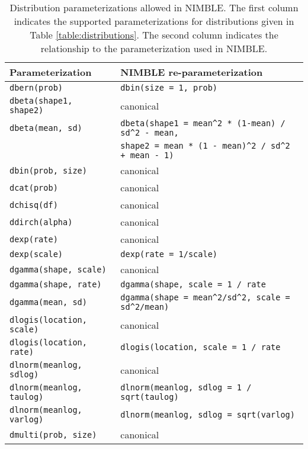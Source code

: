   \begin{center}
    \begin{longtable}{ll}
  \caption{Distribution parameterizations allowed in NIMBLE. The first
    column indicates the supported parameterizations for
    distributions given in Table \ref{table:distributions}. The second column indicates the
    relationship to the  parameterization used in
    NIMBLE. } \label{table:distributions-alternates}\\
      \hline
      Parameterization & NIMBLE re-parameterization \\
      \hline \hline
\endhead
   \texttt{dbern(prob)} & \texttt{dbin(size = 1, prob)} \\
\hline
      \texttt{dbeta(shape1, shape2)} & canonical \\
      \texttt{dbeta(mean, sd)} & \verb|dbeta(shape1 = mean^2 * (1-mean) / sd^2 - mean,| \\
      & \verb|shape2 = mean * (1 - mean)^2 / sd^2 + mean - 1)| \\
\hline
   \texttt{dbin(prob, size)} & canonical \\
\hline
         \texttt{dcat(prob)} & canonical \\
         \texttt{dchisq(df)} & canonical \\
         \texttt{ddirch(alpha)} & canonical \\
      \texttt{dexp(rate)} & canonical \\
       \texttt{dexp(scale)} & \texttt{dexp(rate = 1/scale)} \\
     \texttt{dgamma(shape, scale)} & canonical \\
      \texttt{dgamma(shape, rate)} & \verb|dgamma(shape, scale = 1 / rate| \\
      \texttt{dgamma(mean, sd)} & \verb|dgamma(shape = mean^2/sd^2, scale = sd^2/mean)| \\
     \texttt{dlogis(location, scale)} & canonical \\
     \texttt{dlogis(location, rate)} & \verb|dlogis(location, scale = 1 / rate| \\
     \texttt{dlnorm(meanlog, sdlog)} & canonical \\
     \texttt{dlnorm(meanlog, taulog)} & \verb|dlnorm(meanlog, sdlog = 1 / sqrt(taulog)| \\
     \texttt{dlnorm(meanlog, varlog)} & \verb|dlnorm(meanlog, sdlog = sqrt(varlog)| \\
     \texttt{dmulti(prob, size)} & canonical \\

\end{longtable}
\end{center}
